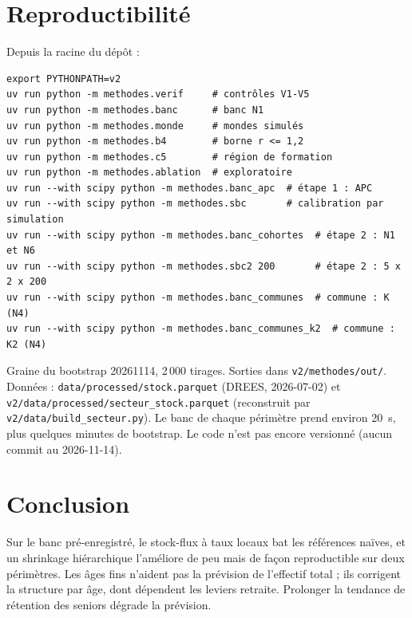 \section{Reproductibilité}
Depuis la racine du dépôt :
\begin{verbatim}
export PYTHONPATH=v2
uv run python -m methodes.verif     # contrôles V1-V5
uv run python -m methodes.banc      # banc N1
uv run python -m methodes.monde     # mondes simulés
uv run python -m methodes.b4        # borne r <= 1,2
uv run python -m methodes.c5        # région de formation
uv run python -m methodes.ablation  # exploratoire
uv run --with scipy python -m methodes.banc_apc  # étape 1 : APC
uv run --with scipy python -m methodes.sbc       # calibration par simulation
uv run --with scipy python -m methodes.banc_cohortes  # étape 2 : N1 et N6
uv run --with scipy python -m methodes.sbc2 200       # étape 2 : 5 x 2 x 200
uv run --with scipy python -m methodes.banc_communes  # commune : K (N4)
uv run --with scipy python -m methodes.banc_communes_k2  # commune : K2 (N4)
\end{verbatim}
Graine du bootstrap 20261114, 2\,000 tirages. Sorties dans \texttt{v2/methodes/out/}. Données :
\texttt{data/processed/stock.parquet} (DREES, 2026-07-02) et
\texttt{v2/data/processed/secteur\_stock.parquet} (reconstruit par \texttt{v2/data/build\_secteur.py}).
Le banc de chaque périmètre prend environ 20\mesure{}~s, plus quelques minutes de bootstrap. Le code
n'est pas encore versionné (aucun commit au 2026-11-14).

\section{Conclusion}
\label{a2-sec:conclusion}
Sur le banc pré-enregistré, le stock-flux à taux locaux bat les références naïves, et un shrinkage
hiérarchique l'améliore de peu mais de façon reproductible sur deux périmètres. Les âges fins n'aident
pas la prévision de l'effectif total ; ils corrigent la structure par âge, dont dépendent les leviers
retraite. Prolonger la tendance de rétention des seniors dégrade la prévision.


